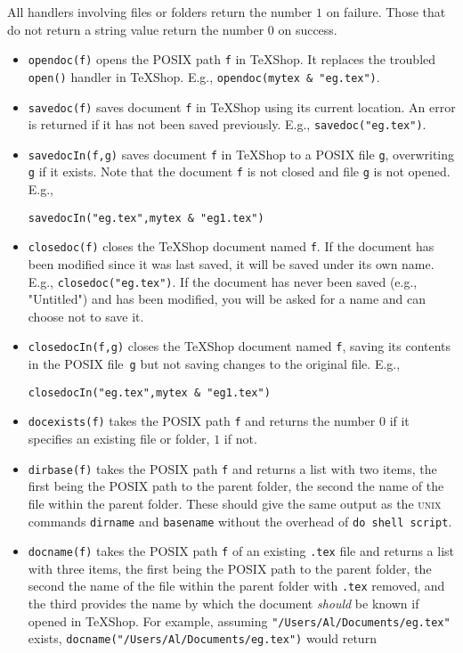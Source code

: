 \documentclass[11pt]{amsart}
\def\TeXShop{\TeX Shop\xspace}
\def\UNIX{\textsc{unix}\xspace}
\begin{document}
All handlers involving files or folders return the number $1$ on failure. Those that do not return a string value return the number $0$ on success.
\begin{itemize}
\item
{\tt opendoc(f)} opens the POSIX path {\tt f} in \TeXShop. It replaces the troubled {\tt open()} handler in \TeXShop. E.g., \verb|opendoc(mytex & "eg.tex")|.
\item {\tt savedoc(f)} saves document {\tt f} in \TeXShop using its current location. An error is returned if it has not been saved previously. E.g., \verb|savedoc("eg.tex")|.
\item {\tt savedocIn(f,g)} saves document {\tt f} in \TeXShop to a POSIX file {\tt g}, overwriting {\tt g} if it exists. Note that the document {\tt f} is not closed and file {\tt g} is not opened. E.g., 
\begin{verbatim}
savedocIn("eg.tex",mytex & "eg1.tex")
\end{verbatim}
\item {\tt closedoc(f)} closes the \TeXShop document named {\tt f}. If the document has been modified since it was last saved, it will be saved under its own name. E.g., \verb|closedoc("eg.tex")|. If the document has never been saved (e.g., "Untitled") and has been modified, you will be asked for a name and can choose not to save it.
\item {\tt closedocIn(f,g)} closes the \TeXShop document named {\tt f}, saving its contents in the POSIX file~{\tt g} but not saving changes to the original file. E.g., 
\begin{verbatim}
closedocIn("eg.tex",mytex & "eg1.tex")
\end{verbatim}
\item {\tt docexists(f)} takes the POSIX path {\tt f} and returns the number $0$ if it specifies an existing  file or folder, $1$ if not. 
\item {\tt dirbase(f)} takes the POSIX path {\tt f} and returns a list with two items, the first being the POSIX path to the parent folder, the second the name of the file within the parent folder. These should give the same output as the \UNIX commands {\tt dirname} and {\tt basename} without the overhead of {\tt do shell script}.
\item {\tt docname(f)} takes the POSIX path {\tt f} of an existing  {\tt.tex} file and returns a list with three items, the first being the POSIX path to the parent folder, the second the name of the file within the parent folder with {\tt.tex} removed, and the third provides the name by which the document \emph{should} be known if opened in \TeXShop. For example, assuming \verb|"/Users/Al/Documents/eg.tex"| exists, \verb|docname("/Users/Al/Documents/eg.tex")| would return 

\end{itemize}
\end{document}
